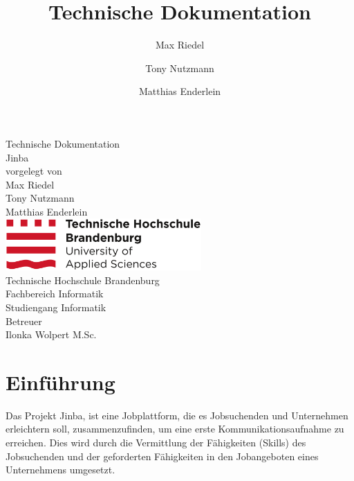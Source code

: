 \documentclass[12pt, letterpaper]{article}
\title{Technische Dokumentation}
\author{Max Riedel \and Tony Nutzmann \and Matthias Enderlein}
\begin{document}
    \begin{titlepage}
        \clearpage
        \begin{center}
        {\Large Technische Dokumentation}\\[3mm]
        {\Huge Jinba}\\[20mm]

        {vorgelegt von}\\[2mm]
        {\large Max Riedel}\\[2mm]
        {\large Tony Nutzmann}\\[2mm]
        {\large Matthias Enderlein}\\[50mm]

        \includegraphics[width=75mm]{img/Technische_Hochschule_Brandenburg_Logo.svg.png}\\[10mm]

        {Technische Hochschule Brandenburg}\\[2mm]

        {Fachbereich Informatik}\\[2mm]

        {Studiengang Informatik}\\[20mm]

        {Betreuer \\[2mm] Ilonka Wolpert M.Sc.}
        \end{center}

        \thispagestyle{empty}
    \end{titlepage}

    \begin{versionhistory}
    \end{versionhistory}
    \newpage
    \tableofcontents
    \newpage
    \section{Einführung}


    Das Projekt Jinba, ist eine Jobplattform, die es Jobsuchenden und Unternehmen
    erleichtern soll, zusammenzufinden, um eine erste Kommunikationsaufnahme zu erreichen.
    Dies wird durch die Vermittlung der Fähigkeiten (Skills) des Jobsuchenden
    und der geforderten Fähigkeiten in den Jobangeboten eines Unternehmens umgesetzt.
\end{document}
